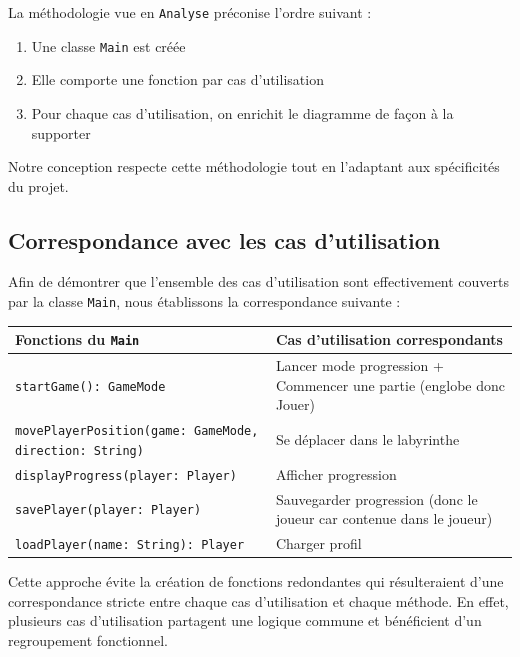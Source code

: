 \documentclass{butexFR}
\begin{document}
La méthodologie vue en \texttt{Analyse} préconise l'ordre suivant :

\begin{enumerate}
\item Une classe \texttt{Main} est créée
\item Elle comporte une fonction par cas d'utilisation
\item Pour chaque cas d'utilisation, on enrichit le diagramme de façon à la supporter
\end{enumerate}

Notre conception respecte cette méthodologie tout en l'adaptant aux spécificités du projet.

\subsection{Correspondance avec les cas d'utilisation}

Afin de démontrer que l'ensemble des cas d'utilisation sont effectivement couverts par la classe \texttt{Main}, nous établissons la correspondance suivante :

\vspace{1em}
\begin{center}
\begin{tabular}{|p{5cm}|p{8cm}|}
\hline
\textbf{Fonctions du \texttt{Main}} & \textbf{Cas d'utilisation correspondants} \\
\hline
\texttt{startGame(): GameMode} & Lancer mode progression + Commencer une partie (englobe donc Jouer)\\
\hline
\texttt{movePlayerPosition(game: GameMode, direction: String)} & Se déplacer dans le labyrinthe \\
\hline
\texttt{displayProgress(player: Player)} & Afficher progression \\
\hline
\texttt{savePlayer(player: Player)}  & Sauvegarder progression (donc le joueur car contenue dans le joueur)\\
\hline
\texttt{loadPlayer(name: String): Player} & Charger profil \\
\hline
\end{tabular}
\end{center}
\vspace{1em}

Cette approche évite la création de fonctions redondantes qui résulteraient d'une correspondance stricte entre chaque cas d'utilisation et chaque méthode. En effet, plusieurs cas d'utilisation partagent une logique commune et bénéficient d'un regroupement fonctionnel.
\end{document}
